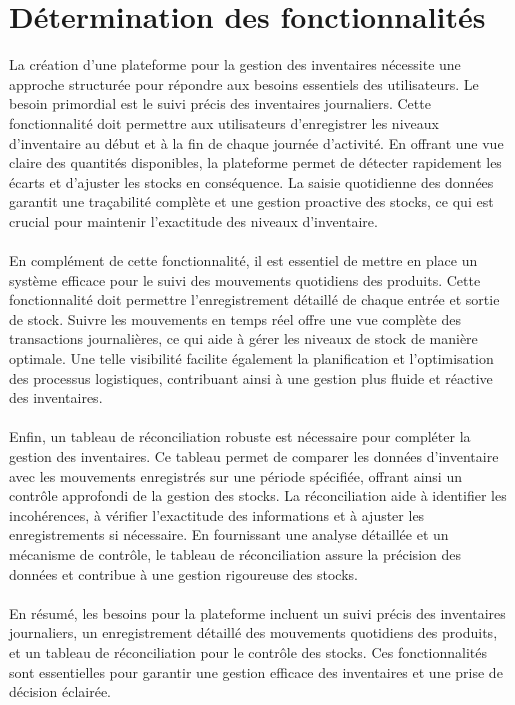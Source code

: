 \documentclass[a4paper, oneside, 12pt, final]{extreport}
\begin{document}
\section{Détermination des fonctionnalités}
La création d'une plateforme pour la gestion des inventaires nécessite une approche structurée pour répondre aux besoins essentiels des utilisateurs. Le besoin primordial est le suivi précis des inventaires journaliers. Cette fonctionnalité doit permettre aux utilisateurs d'enregistrer les niveaux d'inventaire au début et à la fin de chaque journée d'activité. En offrant une vue claire des quantités disponibles, la plateforme permet de détecter rapidement les écarts et d'ajuster les stocks en conséquence. La saisie quotidienne des données garantit une traçabilité complète et une gestion proactive des stocks, ce qui est crucial pour maintenir l'exactitude des niveaux d'inventaire.
\\
\\
En complément de cette fonctionnalité, il est essentiel de mettre en place un système efficace pour le suivi des mouvements quotidiens des produits. Cette fonctionnalité doit permettre l'enregistrement détaillé de chaque entrée et sortie de stock. Suivre les mouvements en temps réel offre une vue complète des transactions journalières, ce qui aide à gérer les niveaux de stock de manière optimale. Une telle visibilité facilite également la planification et l'optimisation des processus logistiques, contribuant ainsi à une gestion plus fluide et réactive des inventaires.
\\
\\
Enfin, un tableau de réconciliation robuste est nécessaire pour compléter la gestion des inventaires. Ce tableau permet de comparer les données d'inventaire avec les mouvements enregistrés sur une période spécifiée, offrant ainsi un contrôle approfondi de la gestion des stocks. La réconciliation aide à identifier les incohérences, à vérifier l'exactitude des informations et à ajuster les enregistrements si nécessaire. En fournissant une analyse détaillée et un mécanisme de contrôle, le tableau de réconciliation assure la précision des données et contribue à une gestion rigoureuse des stocks.
\\
\\
En résumé, les besoins pour la plateforme incluent un suivi précis des inventaires journaliers, un enregistrement détaillé des mouvements quotidiens des produits, et un tableau de réconciliation pour le contrôle des stocks. Ces fonctionnalités sont essentielles pour garantir une gestion efficace des inventaires et une prise de décision éclairée.
\end{document}
